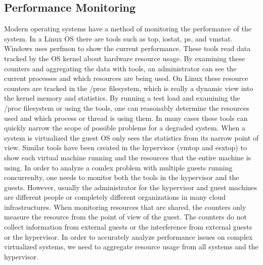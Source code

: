 \subsection{Performance Monitoring}
Modern operating systems have a method of monitoring the performance of the system.  In a Linux OS there are tools such as top, iostat, ps, and vmstat.  Windows uses perfmon to show the current performance.  These tools read data tracked by the OS kernel about hardware resource usage.  By examining these counters and aggregating the data with tools, an administrator can see the current processes and which resources are being used.  
\indent On Linux these resource counters are tracked in the /proc filesystem, which is really a dynamic view into the kernel memory and statistics.  By running a test load and examining the /proc filesystem or using the tools, one can reasonably determine the resources used and which process or thread is using them.  In many cases these tools can quickly narrow the scope of possible problems for a degraded system.
\indent When a system is virtualized the guest OS only sees the statistics from its narrow point of view.  Similar tools have been created in the hypervisor (vmtop and esxtop) to show each virtual machine running and the resources that the entire machine is using.  In order to analyze a comlex problem with multiple guests running concurrenlty, one needs to monitor both the tools in the hypervisor and the guests.  However, usually the administrator for the hypervisor and guest machines are different people or completely different organizations in many cloud infrastructures.  
\indent When monitoring resources that are shared, the counters only measure the resource from the point of view of the guest.  The counters do not collect information from external guests or the interference from external guests or the hypervisor.  In order to accurately analyze performance issues on complex virtualized systems, we need to aggregate resource usage from all systems and the hypervisor.  
